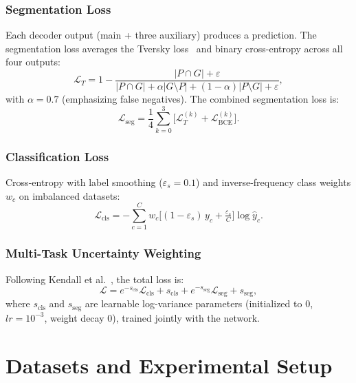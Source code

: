 \documentclass[journal]{IEEEtran}
\begin{document}
\subsubsection{Segmentation Loss}
Each decoder output (main + three auxiliary) produces a prediction. The
segmentation loss averages the Tversky loss~\cite{salehi2017tversky} and
binary cross-entropy across all four outputs:
\begin{equation}
  \mathcal{L}_T = 1 - \frac{|P \cap G| + \varepsilon}
                            {|P \cap G| + \alpha|G \setminus P| + (1-\alpha)|P \setminus G| + \varepsilon},
  \label{eq:tversky}
\end{equation}
with $\alpha = 0.7$ (emphasizing false negatives). The combined segmentation
loss is:
\begin{equation}
  \mathcal{L}_{\text{seg}} = \frac{1}{4}\sum_{k=0}^{3}\!\bigl[\mathcal{L}_T^{(k)} + \mathcal{L}_{\text{BCE}}^{(k)}\bigr].
  \label{eq:seg_loss}
\end{equation}

\subsubsection{Classification Loss}
Cross-entropy with label smoothing ($\varepsilon_s = 0.1$) and inverse-frequency
class weights $w_c$ on imbalanced datasets:
\begin{equation}
  \mathcal{L}_{\text{cls}} = -\sum_{c=1}^{C} w_c
    \bigl[(1-\varepsilon_s)\,y_c + \tfrac{\varepsilon_s}{C}\bigr]\log\hat{y}_c.
  \label{eq:cls_loss}
\end{equation}

\subsubsection{Multi-Task Uncertainty Weighting}
Following Kendall et al.~\cite{kendall2018multitask}, the total loss is:
\begin{equation}
  \mathcal{L} = e^{-s_{\text{cls}}}\mathcal{L}_{\text{cls}} + s_{\text{cls}}
              + e^{-s_{\text{seg}}}\mathcal{L}_{\text{seg}} + s_{\text{seg}},
  \label{eq:kendall}
\end{equation}
where $s_{\text{cls}}$ and $s_{\text{seg}}$ are learnable log-variance
parameters (initialized to 0, $lr=10^{-3}$, weight decay 0), trained jointly
with the network.

\section{Datasets and Experimental Setup}
\label{sec:data}
\end{document}
